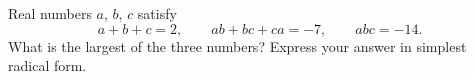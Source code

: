 Real numbers $a$, $b$, $c$ satisfy
\[
a+b+c=2,\qquad ab+bc+ca=-7,\qquad abc=-14 .
\]
What is the largest of the three numbers? Express your answer in simplest radical form.
